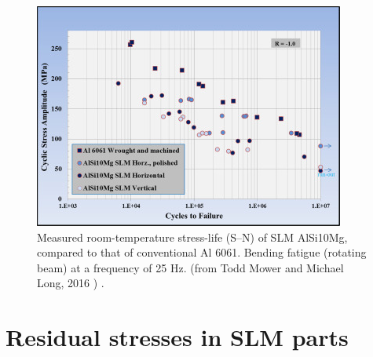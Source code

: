 \begin{figure}[ht]
\centering
\includegraphics[scale=1]{Images/Fat}
\decoRule
\caption[Measured room-temperature stress-life (S–N) of SLM AlSi10Mg, compared to that of conventional Al 6061. Bending fatigue (rotating beam) at a frequency of 25 Hz. ]{Measured room-temperature stress-life (S–N) of SLM AlSi10Mg, compared to that of conventional Al 6061. Bending fatigue (rotating beam) at a frequency of 25 Hz. (from Todd Mower and Michael Long, 2016 \parencite{MOWER2016198}) .}
\label{Fat}
\end{figure} 
 
%

\section{Residual stresses in SLM parts}
\label{EARSSP}


